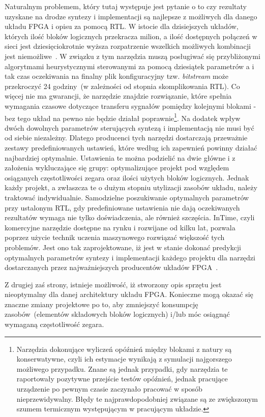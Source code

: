 Naturalnym problemem, który tutaj występuje jest pytanie o to czy rezultaty uzyskane na drodze syntezy i implementacji są najlepsze z możliwych dla danego układu FPGA i opisu za pomocą RTL. W istocie dla dzisiejszych układów, których ilość bloków logicznych przekracza milion, a ilość dostępnych połączeń w sieci jest dziesięciokrotnie wyższa rozpatrzenie wszelkich możliwych kombinacji jest niemożliwe~\cite{FPGA_SD}. W związku z tym narzędzia muszą posługiwać się przybliżonymi algorytmami heurystycznymi sterowanymi za pomocą dziesiątek parametrów a i tak czas oczekiwania na finalny plik konfiguracyjny tzw. \textit{bitstream} może przekroczyć 24 godziny~(w zależności od stopnia skomplikowania RTL). Co więcej nie ma gwarancji, że narzędzie znajdzie rozwiązanie, które spełnia wymagania czasowe dotyczące transferu sygnałów pomiędzy kolejnymi blokami - bez tego układ na pewno nie będzie działał poprawnie\footnote{Narzędzia dokonujące wyliczeń opóźnień między blokami z natury są konserwatywne, czyli ich estymacje wynikają z symulacji najgorszego możliwego przypadku. Znane są jednak przypadki, gdy narzędzia te raportowały pozytywne przejście testów opóźnień, jednak pracujące urządzenie po pewnym czasie zaczynało pracować w sposób nieprzewidywalny. Błędy te najprawdopodobniej związane są ze zwiększonym szumem termicznym występującym w pracującym układzie. }. Na dodatek wpływ dwóch dowolnych parametrów sterujących syntezą i implementacją nie musi być od siebie niezależny. Dlatego producenci tych narzędzi dostarczają przeważnie zestawy predefiniowanych ustawień, które według ich zapewnień powinny działać najbardziej optymalnie. Ustawienia te można podzielić na dwie główne i z założenia wykluczające się grupy: optymalizujące projekt pod względem osiąganych częstotliwości zegara oraz ilości użytych bloków logicznych. Jednak każdy projekt, a zwłaszcza te o dużym stopniu utylizacji zasobów układu, należy traktować indywidualnie. Samodzielne poszukiwanie optymalnych parametrów przy ustalonym RTL, gdy predefiniowane ustawienia nie dają oczekiwanych rezultatów wymaga nie tylko doświadczenia, ale również szczęścia. InTime, czyli komercyjne narzędzie dostępne na rynku i rozwijane od kilku lat, pozwala poprzez użycie technik uczenia maszynowego rozwiązać większość tych problemów. Jest ono tak zaprojektowane, iż jest w stanie dokonać predykcji optymalnych parametrów syntezy i implementacji każdego projektu dla narzędzi dostarczanych przez najważniejszych producentów układów FPGA~\cite{InTime1}\cite{InTime2}\cite{InTime3}. 

Z drugiej zaś strony, istnieje możliwość, iż stworzony opis sprzętu jest nieoptymalny dla danej architektury układu FPGA. Konieczne mogą okazać się znaczne zmiany projektowe po to, aby zmniejszyć konsumpcję zasobów~(elementów składowych bloków logicznych) i/lub móc osiągnąć wymaganą częstotliwość zegara. 

